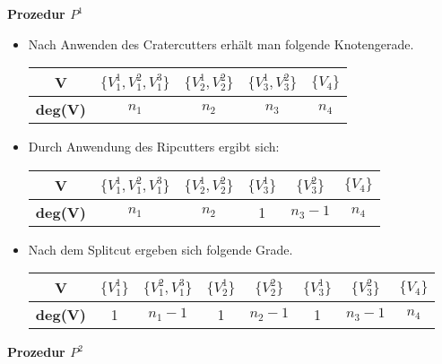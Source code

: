 \documentclass[12pt,titlepage]{article}
\begin{document}
 \textbf{Prozedur $P^1$}
 \begin{itemize}
 \item Nach Anwenden des Cratercutters erhält man folgende Knotengerade.
 \begin{center}
\begin{tabular}{|c|c|c|c|c|}
\hline
  \textbf{V} & $\{V_1^1,V_1^2,V_1^3\}$ & $\{V_2^1,V_2^2\}$& $\{V_3^1,V_3^2\}$& $\{V_4\}$\\ 
  \hline
   \textbf{deg(V)} & $n_1$ & $n_2$ & $n_3$ & $n_4$ \\  
   \hline
 \end{tabular}
 \end{center}

\item %
Durch Anwendung des Ripcutters ergibt sich:
\begin{center}
\begin{tabular}{|c|c|c|c|c|c|}
\hline
  \textbf{V} & $\{V_1^1,V_1^2,V_1^3\}$ & $\{V_2^1,V_2^2\}$& $\{V_3^1\}$ & $\{V_3^2\}$& $\{V_4\}$\\ 
  \hline
   \textbf{deg(V)} & $n_1$ & $n_2$ & 1 & $n_3-1$ & $n_4$ \\  
   \hline
 \end{tabular}
 \end{center}
\item %
Nach dem Splitcut ergeben sich folgende Grade.
\begin{center}
\begin{tabular}{|c|c|c|c|c|c|c|c|}
\hline
  \textbf{V} & $\{V_1^1\}$ & $\{V_1^2,V_1^3\}$ & $\{V_2^1\}$ & $\{V_2^2\} $ & $\{V_3^1\}$ & $\{V_3^2\}$& $\{V_4\}$\\ 
  \hline
   \textbf{deg(V)} & 1 & $n_1-1$ &1& $n_2-1
   $ & 1 & $n_3-1$ & $n_4$ \\  
   \hline
 \end{tabular}
 \end{center}
 \end{itemize}
\textbf{Prozedur $P^2$}
\end{document}
